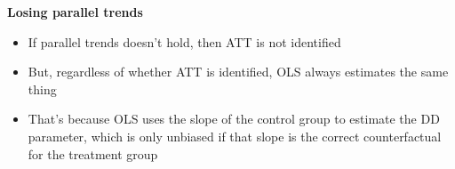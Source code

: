 \documentclass[notes=show]{beamer}
\begin{document}
\begin{frame}[plain]
\begin{center}
\textbf{Losing parallel trends}
\end{center}

\begin{itemize}
\item If parallel trends doesn't hold, then ATT is not identified
\item But, regardless of whether ATT is identified, OLS always estimates the same thing
\item That's because OLS uses the slope of the control group to estimate the DD parameter, which is only unbiased if that slope is the correct counterfactual for the treatment group
\end{itemize}

\end{frame}
\end{document}
